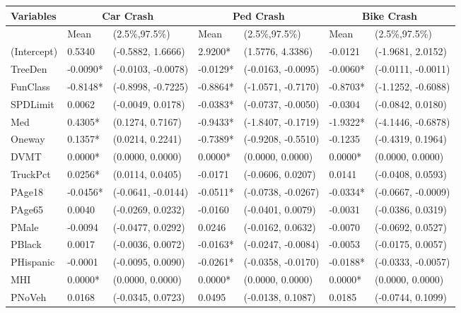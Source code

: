 
\begin{table}[ht]
\centering
\begin{tabular}{lllllll}
\toprule
\hline
\multirow{2}{*}{\textbf{Variables}} & \multicolumn{2}{c}{\textbf{Car Crash}} & \multicolumn{2}{c}{\textbf{Ped Crash}} & \multicolumn{2}{c}{\textbf{Bike Crash}} \\
\midrule
& Mean & (2.5\%,97.5\%) & Mean & (2.5\%,97.5\%) & Mean & (2.5\%,97.5\%) \\
\hline
(Intercept) & 0.5340 & (-0.5882, 1.6666) & 2.9200* & (1.5776, 4.3386) & -0.0121 & (-1.9681, 2.0152) \\
TreeDen & -0.0090* & (-0.0103, -0.0078) & -0.0129* & (-0.0163, -0.0095) & -0.0060* & (-0.0111, -0.0011) \\
FunClass & -0.8148* & (-0.8998, -0.7225) & -0.8864* & (-1.0571, -0.7170) & -0.8703* & (-1.1252, -0.6088) \\
SPDLimit & 0.0062 & (-0.0049, 0.0178) & -0.0383* & (-0.0737, -0.0050) & -0.0304 & (-0.0842, 0.0180) \\
Med & 0.4305* & (0.1274, 0.7167) & -0.9433* & (-1.8407, -0.1719) & -1.9322* & (-4.1446, -0.6878) \\
Oneway & 0.1357* & (0.0214, 0.2241) & -0.7389* & (-0.9208, -0.5510) & -0.1235 & (-0.4319, 0.1964) \\
DVMT & 0.0000* & (0.0000, 0.0000) & 0.0000* & (0.0000, 0.0000) & 0.0000* & (0.0000, 0.0000) \\
TruckPct & 0.0256* & (0.0114, 0.0405) & -0.0171 & (-0.0606, 0.0207) & 0.0141 & (-0.0408, 0.0593) \\
PAge18 & -0.0456* & (-0.0641, -0.0144) & -0.0511* & (-0.0738, -0.0267) & -0.0334* & (-0.0667, -0.0009) \\
PAge65 & 0.0040 & (-0.0269, 0.0232) & -0.0160 & (-0.0401, 0.0079) & -0.0031 & (-0.0386, 0.0319) \\
PMale & -0.0094 & (-0.0477, 0.0292) & 0.0246 & (-0.0162, 0.0632) & -0.0070 & (-0.0692, 0.0527) \\
PBlack & 0.0017 & (-0.0036, 0.0072) & -0.0163* & (-0.0247, -0.0084) & -0.0053 & (-0.0175, 0.0057) \\
PHispanic & -0.0001 & (-0.0095, 0.0090) & -0.0261* & (-0.0358, -0.0170) & -0.0188* & (-0.0333, -0.0057) \\
MHI & 0.0000* & (0.0000, 0.0000) & 0.0000* & (0.0000, 0.0000) & 0.0000* & (0.0000, 0.0000) \\
PNoVeh & 0.0168 & (-0.0345, 0.0723) & 0.0495 & (-0.0138, 0.1087) & 0.0185 & (-0.0744, 0.1099) \\

\end{tabular}
\end{table}
